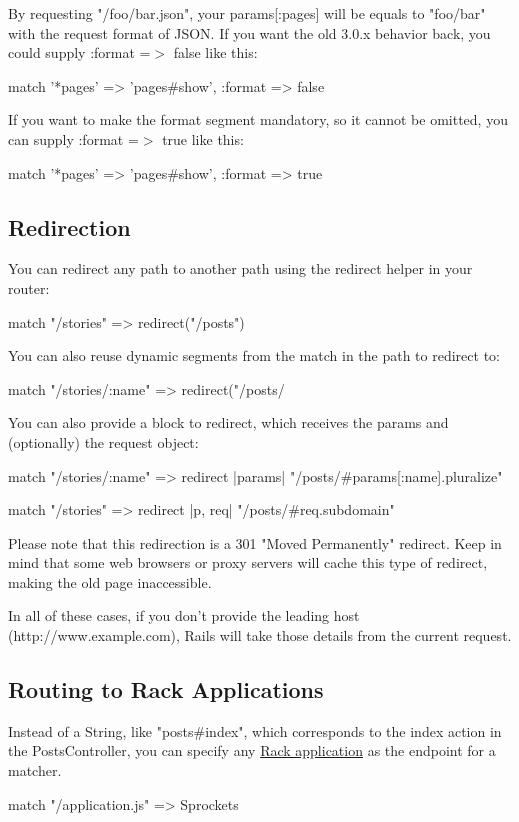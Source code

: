\documentclass[10pt]{book}
\newenvironment{code}{%
  \scriptsize
    \verbatim
}{%
    \endverbatim
    \newline
}
\begin{document}
By requesting "/foo/bar.json", your params[:pages] will be equals to "foo/bar" with the request format of JSON. If you want the old 3.0.x behavior back, you could supply :format =$>$ false like this:
\begin{code}
match '*pages' => 'pages#show', :format => false
\end{code}

If you want to make the format segment mandatory, so it cannot be omitted, you can supply :format =$>$ true like this:
\begin{code}
match '*pages' => 'pages#show', :format => true
\end{code}

\subsection{ Redirection}

You can redirect any path to another path using the redirect helper in your router:
\begin{code}
match "/stories" => redirect("/posts")
\end{code}

You can also reuse dynamic segments from the match in the path to redirect to:
\begin{code}
match "/stories/:name" => redirect("/posts/%
\end{code}

You can also provide a block to redirect, which receives the params and (optionally) the request object:
\begin{code}
match "/stories/:name" 
=> redirect {|params| "/posts/#{params[:name].pluralize}" }

match "/stories" 
=> redirect {|p, req| "/posts/#{req.subdomain}" }
\end{code}

Please note that this redirection is a 301 "Moved Permanently"  redirect. Keep in mind that some web browsers or proxy servers will  cache this type of redirect, making the old page inaccessible.

In all of these cases, if you don’t provide the leading host (http://www.example.com), Rails will take those details from the current request.

\subsection{ Routing to Rack Applications}

Instead of a String, like "posts\#index", which corresponds to the index action in the PostsController, you can specify any \href{http://guides.rubyonrails.org/rails_on_rack.html}{Rack application} as the endpoint for a matcher.
\begin{code}
match "/application.js" => Sprockets
\end{code}
\end{document}
